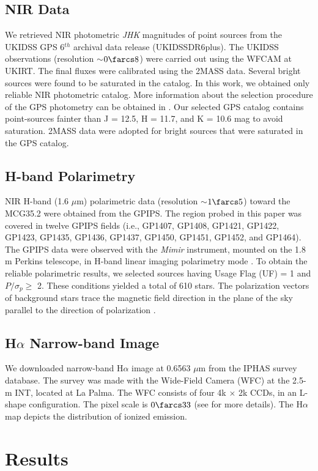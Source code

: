 \documentclass[iop]{emulateapj}
\begin{document}
\subsection{NIR Data}
%
We retrieved NIR photometric {\it JHK} magnitudes of point sources from the UKIDSS GPS 6$^{th}$ archival data release (UKIDSSDR6plus). 
The UKIDSS observations (resolution $\sim$$0\farcs8$) were carried out using the WFCAM at UKIRT. 
The final fluxes were calibrated using the 2MASS data. Several bright sources were found to be saturated in the catalog. 
In this work, we obtained only reliable NIR photometric catalog. 
More information about the selection procedure of the GPS photometry can be obtained in \citet{dewangan15}.
Our selected GPS catalog contains point-sources fainter than J = 12.5, H = 11.7, and K = 10.6 mag to avoid saturation. 
2MASS data were adopted for bright sources that were saturated in the GPS catalog. 
%
\subsection{H-band Polarimetry}
%
NIR H-band (1.6 $\mu$m) polarimetric data (resolution $\sim$$1\farcs5$) toward the MCG35.2 were obtained from the 
GPIPS. The region probed in this paper was covered in twelve GPIPS fields (i.e., 
GP1407, GP1408, GP1421, GP1422, GP1423, GP1435, GP1436, GP1437, GP1450, GP1451, GP1452, and GP1464). 
The GPIPS data were observed with the {\it Mimir} instrument, mounted on the 1.8 m Perkins telescope, 
in H-band linear imaging polarimetry mode \citep[see][for more details]{clemens12}. 
To obtain the reliable polarimetric results, we selected sources having Usage Flag (UF) = 1 
and $P/\sigma_p \ge$ 2. These conditions yielded a total of 610 stars. 
The polarization vectors of background stars trace the magnetic field direction in the plane of the sky parallel to the direction of
polarization \citep{davis51}.
%
\subsection{H$\alpha$ Narrow-band Image}
We downloaded narrow-band H$\alpha$ image at 0.6563 $\mu$m from the IPHAS survey database. 
The survey was made with the Wide-Field Camera (WFC) at the 2.5-m INT, located at La Palma. 
The WFC consists of four 4k $\times$ 2k CCDs, in an L-shape configuration. The pixel
scale is $0\farcs33$ (see \citet{drew05} for more details). 
The H$\alpha$ map depicts the distribution of ionized emission. 
%
\section{Results}
\label{sec:data}
\end{document}
